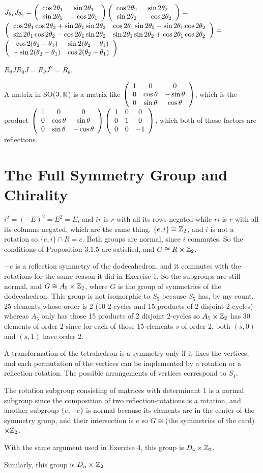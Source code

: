 \documentclass[11pt, oneside]{article}   	%
\begin{document}
\item $J_{\theta_1}J_{\theta_2} = \left( \begin{array}{ccc} \cos2\theta_1 & \sin2\theta_1 \\ \sin2\theta_1 & -\cos2\theta_1 \end{array} \right) \left( \begin{array}{ccc} \cos2\theta_2 & \sin2\theta_2 \\ \sin2\theta_2 & -\cos2\theta_2 \end{array} \right) = $\\ $ \left( \begin{array}{ccc} \cos2\theta_1\cos2\theta_2 + \sin2\theta_1\sin2\theta_2 & \cos2\theta_1\sin2\theta_2 - \sin2\theta_1\cos2\theta_2 \\ \sin2\theta_1\cos2\theta_2 - \cos2\theta_1\sin2\theta_2 & \sin2\theta_1\sin2\theta_2 + \cos2\theta_1\cos2\theta_2 \end{array} \right) = $ \\ $\left( \begin{array}{ccc} \cos2(\theta_2 - \theta_1) & \sin2(\theta_2 - \theta_1) \\ -\sin2(\theta_2 - \theta_1) & \cos2(\theta_2 - \theta_1) \end{array} \right)$
\item $R_\theta JR_0J = R_\theta J^2 = R_\theta$.
\ee
\item A matrix in SO($3, \mathbb{R}$) is a matrix like $\left( \begin{array}{ccc} 1 & 0 & 0 \\ 0 & \cos\theta & -\sin\theta \\ 0 & \sin\theta & \cos\theta \end{array} \right)$, which is the product $\left( \begin{array}{ccc} 1 & 0 & 0 \\ 0 & \cos\theta & \sin\theta \\ 0 & \sin\theta & -\cos\theta \end{array} \right) \left( \begin{array}{ccc} 1 & 0 & 0 \\ 0 & 1 & 0 \\ 0 & 0 & -1 \end{array} \right)$, which both of those factors are reflections.
\ee
\section{The Full Symmetry Group and Chirality}
\be
\item $i^2 = (-E)^2 = E^2 = E$, and $ir$ is $r$ with all its rows negated while $ri$ is $r$ with all its columns negated, which are the same thing. $\{e, i\} \cong \mathbb{Z}_2$, and $i$ is not a rotation so $\{e, i\} \cap R = e$. Both groups are normal, since $i$ commutes. So the conditions of Proposition 3.1.5 are satisfied, and $G \cong R \times \mathbb{Z}_2$.
\item $-e$ is a reflection symmetry of the dodecahedron, and it commutes with the rotations for the same reason it did in Exercise 1. So the subgroups are still normal, and $G \cong A_5 \times \mathbb{Z}_2$, where $G$ is the group of symmetries of the dodecahedron. This group is not isomorphic to $S_5$ because $S_5$ has, by my count, 25 elements whose order is 2 (10 2-cycles and 15 products of 2 disjoint 2-cycles) whereas $A_5$ only has those 15 products of 2 disjoint 2-cycles so $A_5 \times \mathbb{Z}_2$ has 30 elements of order 2 since for each of those 15 elements $s$ of order 2, both $(s, 0)$ and $(s, 1)$ have order 2.
\item A transformation of the tetrahedron is a symmetry only if it fixes the vertices, and each permutation of the vertices can be implemented by a rotation or a reflection-rotation. The possible arrangements of vertices correspond to $S_4$. 
\item The rotation subgroup consisting of matrices with determinant 1 is a normal subgroup since the composition of two reflection-rotations is a rotation, and another subgroup $\{e, -e\}$ is normal because its elements are in the center of the symmetry group, and their intersection is $e$ so $G \cong $(the symmetries of the card) $\times \mathbb{Z}_2$.
\item With the same argument used in Exercise 4, this group is $D_4 \times \mathbb{Z}_2$.
\item Similarly, this group is $D_n \times \mathbb{Z}_2$.
\ee
\end{document}
